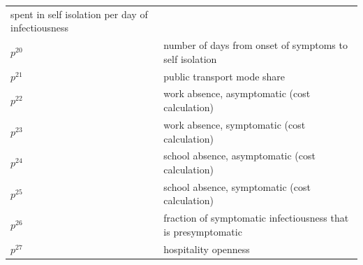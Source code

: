 \documentclass[
]{article}
\begin{document}
\begin{longtable}[]{@{}
  >{\centering\arraybackslash}p{}
  >{\centering\arraybackslash}p{}@{}}
spent in self isolation per
day of infectiousness \\
\(p^{20}\) & number of days from onset of
symptoms to self isolation \\
\(p^{21}\) & public transport mode share \\
\(p^{22}\) & work absence, asymptomatic
(cost calculation) \\
\(p^{23}\) & work absence, symptomatic
(cost calculation) \\
\(p^{24}\) & school absence, asymptomatic
(cost calculation) \\
\(p^{25}\) & school absence, symptomatic
(cost calculation) \\
\(p^{26}\) & fraction of symptomatic
infectiousness that is
presymptomatic \\
\(p^{27}\) & hospitality openness \\
\bottomrule
\end{longtable}

\newpage
\end{document}
